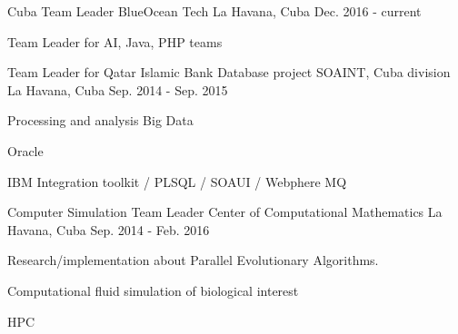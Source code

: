 


\begin{cventries}


\cventry
{Cuba Team Leader} %
{BlueOcean Tech} %
{La Havana, Cuba} %
{Dec. 2016 - current} %
{ %
\begin{cvitems}
\item {Team Leader for AI, Java, PHP teams}
\end{cvitems}
}


\cventry
{Team Leader for Qatar Islamic Bank Database project} %
{SOAINT, Cuba division} %
{La Havana, Cuba} %
{Sep. 2014 - Sep. 2015} %
{ %
\begin{cvitems}
\item {Processing and analysis Big Data}
\item {Oracle}
\item {IBM Integration toolkit / PLSQL / SOAUI / Webphere MQ}
\end{cvitems}
}



\cventry
{Computer Simulation Team Leader} %
{Center of Computational Mathematics} %
{La Havana, Cuba} %
{Sep. 2014 - Feb. 2016} %
{ %
\begin{cvitems}
\item {Research/implementation about Parallel Evolutionary Algorithms.}
\item {Computational fluid simulation of biological interest}
\item {HPC}
\end{cvitems}
}



\end{cventries}
